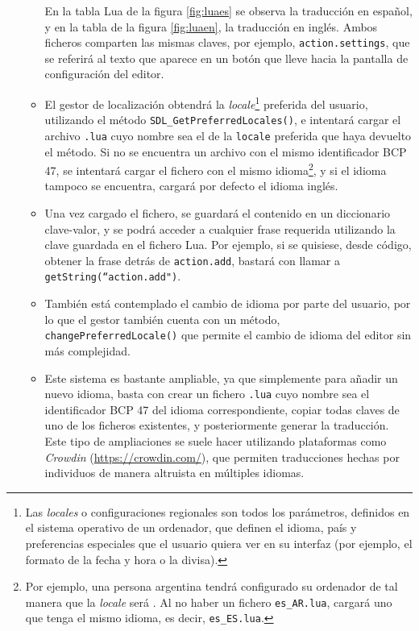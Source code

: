\begin{itemize}
\begin{itemize}
	En la tabla Lua de la figura \ref{fig:luaes} se observa la traducción en español, y en la tabla de la figura \ref{fig:luaen}, la traducción en inglés. Ambos ficheros comparten las mismas claves, por ejemplo, \texttt{action.settings}, que se referirá al texto que aparece en un botón que lleve hacia la pantalla de configuración del editor.
	\item El gestor de localización obtendrá la \textit{locale}\footnote{Las \textit{locales} o configuraciones regionales son todos los parámetros, definidos en el sistema operativo de un ordenador, que definen el idioma, país y preferencias especiales que el usuario quiera ver en su interfaz (por ejemplo, el formato de la fecha y hora o la divisa).} preferida del usuario, utilizando el método \texttt{SDL\_GetPreferredLocales()}, e intentará cargar el archivo \texttt{.lua} cuyo nombre sea el de la \texttt{locale} preferida que haya devuelto el método. Si no se encuentra un archivo con el mismo identificador BCP 47, se intentará cargar el fichero con el mismo idioma\footnote{Por ejemplo, una persona argentina tendrá configurado su ordenador de tal manera que la \textit{locale} será . Al no haber un fichero \texttt{es\_AR.lua}, cargará uno que tenga el mismo idioma, es decir, \texttt{es\_ES.lua}.}, y si el idioma tampoco se encuentra, cargará por defecto el idioma inglés.
	\item Una vez cargado el fichero, se guardará el contenido en un diccionario clave-valor, y se podrá acceder a cualquier frase requerida utilizando la clave guardada en el fichero Lua. Por ejemplo, si se quisiese, desde código, obtener la frase detrás de \texttt{action.add}, bastará con llamar a \texttt{getString(``action.add")}.
	\item También está contemplado el cambio de idioma por parte del usuario, por lo que el gestor también cuenta con un método, \texttt{changePreferredLocale()} que permite el cambio de idioma del editor sin más complejidad.
	\item Este sistema es bastante ampliable, ya que simplemente para añadir un nuevo idioma, basta con crear un fichero \texttt{.lua} cuyo nombre sea el identificador BCP 47 del idioma correspondiente, copiar todas claves de uno de los ficheros existentes, y posteriormente generar la traducción. Este tipo de ampliaciones se suele hacer utilizando plataformas como \textit{Crowdin} (\url{https://crowdin.com/}), que permiten traducciones hechas por individuos de manera altruista en múltiples idiomas.
	\end{itemize}

\end{itemize}
